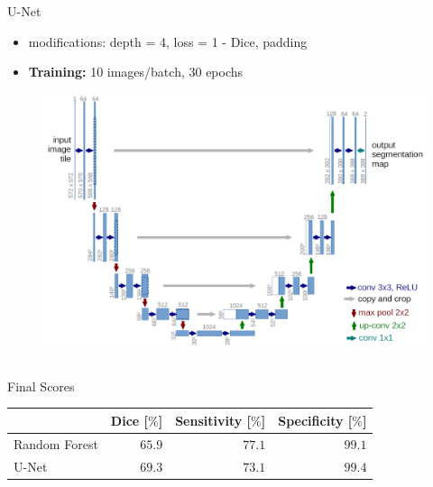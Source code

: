 \documentclass[final]{beamer}
\newlength{\onecolwid}
\newlength{\twocolwid}
\begin{document}
\begin{frame}[t]
\begin{columns}[t]
\begin{column}{\twocolwid}
\begin{columns}[t,totalwidth=\twocolwid]
\begin{column}{\onecolwid}
\begin{alertblock}{U-Net \cite{ronneberger2015u}}
\vspace*{12pt}
\begin{itemize}[label={}]
\item modifications: depth = 4, loss = 1 - Dice, padding
\item \textbf{Training:} 10 images/batch, 30 epochs
\end{itemize}
\begin{figure}
\centering
\includegraphics[width=0.9\linewidth]{u_net}
\end{figure}
\end{alertblock}

\end{column} %

\end{columns} %

\begin{alertblock}{Final Scores}
\centering
	\begin{tabular}{lrrr}
	\toprule
	 & Dice [$\%$] & Sensitivity [$\%$] & Specificity [$\%$] \\
	\midrule
	Random Forest & $65.9$ & $77.1$ & $99.1$ \\
	U-Net & $69.3$ & $73.1$ & $99.4$ \\
	\bottomrule
	\end{tabular}
\end{alertblock}



\end{column}
\end{columns}
\end{frame}
\end{document}
